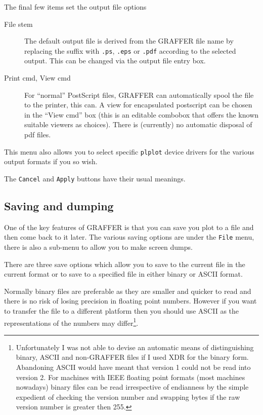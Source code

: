 \documentclass[11pt,twoside,english]{article}
\begin{document}
The final few items set the output file options
\begin{description}
\item[File stem] The default output file is derived from the GRAFFER
  file name by replacing the suffix with \texttt{.ps}, \texttt{.eps} or
  \texttt{.pdf} according to the selected output. This can be changed
  via the output file entry box.
\item[Print cmd, View cmd] 
 For ``normal'' PostScript files, GRAFFER can automatically spool
 the file to the printer, this can.  A view for encapsulated postscript
 can be chosen in the ``View cmd'' box (this is an editable combobox
 that offers the known suitable viewers as choices). There is
 (currently) no automatic disposal of pdf files.
\end{description}

This menu also allows you to select specific \texttt{plplot} device
drivers for the various output formats if you so wish.

The \texttt{Cancel} and \texttt{Apply} buttons have their usual
meanings.


\subsection{Saving and dumping}

One of the key features of GRAFFER is that you can save you plot to a
file and then come back to it later. The various saving options are
under the \texttt{File} menu, there is also a sub-menu to allow you to
make screen dumps.

There are three save options which allow you to save to the current
file in the current format or to save to a specified file in either
binary or ASCII format.

Normally binary files are preferable as they are smaller and quicker to
read and there is no risk of losing precision in floating point
numbers. However if you want to transfer the file to a different
platform then you should use ASCII as the representations of the
numbers may differ\footnote{Unfortunately I was not able to devise an
  automatic means of distinguishing binary, ASCII and non-GRAFFER files
  if I used XDR for the binary form.  Abandoning ASCII would have meant
  that version 1 could not be read into version 2. For machines with
  IEEE floating point formats (most machines nowadays) binary files can
  be read irrespective of endianness by the simple expedient of
  checking the version number and swapping bytes if the raw version
  number is greater then 255.}.
\end{document}
